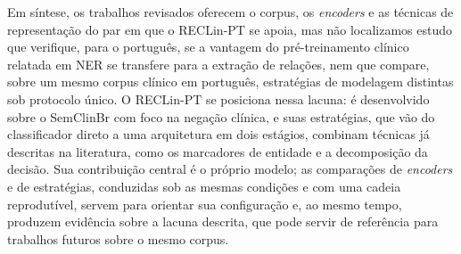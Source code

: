 Em síntese, os trabalhos revisados oferecem o corpus, os \emph{encoders} e as
técnicas de representação do par em que o RECLin-PT se apoia, mas não localizamos
estudo que verifique, para o português, se a vantagem do pré-treinamento clínico
relatada em NER se transfere para a extração de relações, nem que compare, sobre um
mesmo corpus clínico em português, estratégias de modelagem distintas sob protocolo
único. O RECLin-PT se posiciona nessa lacuna: é desenvolvido sobre o SemClinBr com
foco na negação clínica, e suas estratégias, que vão do classificador direto a uma
arquitetura em dois estágios, combinam técnicas já descritas na literatura, como os
marcadores de entidade e a decomposição da decisão. Sua contribuição central é o
próprio modelo; as comparações de \emph{encoders} e de estratégias, conduzidas sob as
mesmas condições e com uma cadeia reprodutível, servem para orientar sua configuração
e, ao mesmo tempo, produzem evidência sobre a lacuna descrita, que pode servir de
referência para trabalhos futuros sobre o mesmo corpus.
